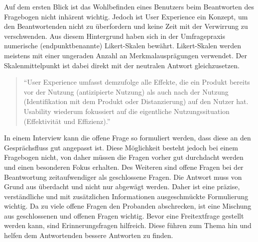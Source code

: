 Auf dem ersten Blick ist das Wohlbefinden eines Benutzers beim Beantworten des Fragebogen nicht inhärent wichtig. 
Jedoch ist User Experience ein Konzept, um den Beantwortenden nicht zu überfordern und keine Zeit mit der Verwirrung zu verschwenden.
Aus diesem Hintergrund haben sich in der Umfragepraxis numerische (endpunktbenannte) Likert-Skalen bewährt\autocite{Likert}. %
Likert-Skalen werden meistens mit einer ungeraden Anzahl an Merkmalausprägungen verwendet. Der Skalenmittelpunkt ist dabei direkt mit der neutralen Antwort gleichzusetzen\autocite{ISO}. \label{Likert} 

\begin{quote}
	\enquote{User Experience umfasst demzufolge alle Effekte, die ein Produkt bereits vor der Nutzung (antizipierte Nutzung) als auch nach der Nutzung (Identifikation mit dem Produkt oder Distanzierung) auf den Nutzer hat. Usability wiederum fokussiert auf die eigentliche Nutzungssituation (Effektivität und Effizienz).}\autocite{User}%
\end{quote}

In einem Interview kann die offene Frage so formuliert werden, dass diese an den Gesprächsfluss gut angepasst ist.
Diese Möglichkeit besteht jedoch bei einem Fragebogen nicht, von daher müssen die Fragen vorher gut durchdacht werden und einen besonderen Fokus erhalten.
Des Weiteren sind offene Fragen bei der Beantwortung zeitaufwendiger als geschlossene Fragen. 
Die Antwort muss von Grund aus überdacht und nicht nur abgewägt werden. 
Daher ist eine präzise, verständliche und mit zusätzlichen Informationen ausgeschmückte Formulierung wichtig. 
Da zu viele offene Fragen den Probanden abschrecken, ist eine Mischung aus geschlossenen und offenen Fragen wichtig.
Bevor eine Freitextfrage gestellt werden kann, sind Erinnerungsfragen hilfreich. Diese führen zum Thema hin und helfen dem Antwortenden bessere Antworten zu finden\autocite[S.35]{2009Fragebogen}.%


